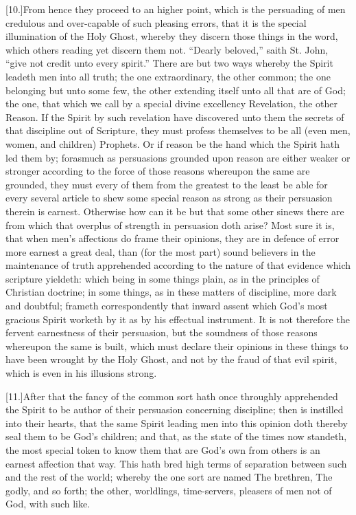 [10.]From hence they proceed to an higher point, which is the persuading of men credulous and over-capable of such pleasing errors, that it is the special illumination of the Holy Ghost, whereby they discern those things in the word, which others reading yet discern them not. “Dearly beloved,” saith St. John, “give not credit unto every spirit.” There are but two ways whereby the Spirit leadeth men into all truth; the one extraordinary, the other common; the one belonging but unto some few, the other extending itself unto all that are of God; the one, that which we call by a special divine excellency Revelation, the other Reason. If the Spirit by such revelation have discovered unto them the secrets of that discipline out of Scripture, they must profess themselves to be all (even men, women, and children) Prophets. Or if reason be the hand which the Spirit hath led them by; forasmuch as persuasions grounded upon reason are either weaker or stronger according to the force of those reasons whereupon the same are grounded, they must every of them from the greatest to the least be able for every several article to shew some special reason as strong as their persuasion therein is earnest. Otherwise how can it be but that some other sinews there are from which that overplus of strength in persuasion doth arise? Most sure it is, that when men’s affections do frame their opinions, they are in defence of error more earnest a great deal, than (for the most part) sound believers in the maintenance of truth apprehended according to the nature of that evidence which scripture yieldeth: which being in some things plain, as in the principles of Christian doctrine; in some things, as in these matters of discipline, more dark and doubtful; frameth correspondently that inward assent which God’s most gracious Spirit worketh by it as by his effectual instrument. It is not therefore the fervent earnestness of their persuasion, but the soundness of those reasons whereupon the same is built, which must declare their opinions in these things to have been wrought by the Holy Ghost, and not by the fraud of that evil spirit, which is even in his illusions strong.

[11.]After that the fancy of the common sort hath once throughly apprehended the Spirit to be author of their persuasion concerning discipline; then is instilled into their hearts, that the same Spirit leading men into this opinion doth thereby seal them to be God’s children; and that, as the state of the times now standeth, the most special token to know them that are God’s own from others is an earnest affection that way. This hath bred high terms of separation between such and the rest of the world; whereby the one sort are named The brethren, The godly, and so forth; the other, worldlings, time-servers, pleasers of men not of God, with such like.

